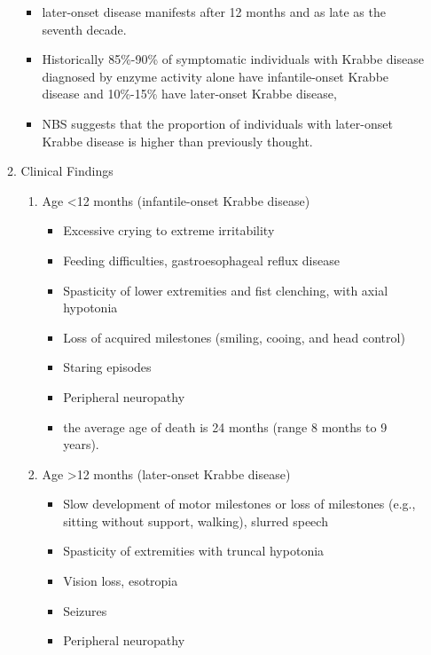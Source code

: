 \documentclass{scrartcl}
\begin{document}
\begin{enumerate}
\begin{enumerate}
\begin{itemize}
\item later-onset disease manifests after 12 months and as late as the
seventh decade.

\item Historically 85\%-90\% of symptomatic individuals with Krabbe disease
diagnosed by enzyme activity alone have infantile-onset Krabbe
disease and 10\%-15\% have later-onset Krabbe disease,

\item NBS suggests that the proportion of individuals with later-onset
Krabbe disease is higher than previously thought.
\end{itemize}

\item Clinical Findings
\label{sec:org411cb1e}

\begin{enumerate}
\item Age <12 months (infantile-onset Krabbe disease)
\label{sec:orgbc9cdb8}

\begin{itemize}
\item Excessive crying to extreme irritability
\item Feeding difficulties, gastroesophageal reflux disease
\item Spasticity of lower extremities and fist clenching, with axial hypotonia
\item Loss of acquired milestones (smiling, cooing, and head control)
\item Staring episodes
\item Peripheral neuropathy
\item the average age of death is 24 months (range 8 months to 9 years).
\end{itemize}

\item Age >12 months (later-onset Krabbe disease)
\label{sec:org36ce434}

\begin{itemize}
\item Slow development of motor milestones or loss of milestones (e.g.,
sitting without support, walking), slurred speech
\item Spasticity of extremities with truncal hypotonia
\item Vision loss, esotropia
\item Seizures
\item Peripheral neuropathy
\end{itemize}
\end{enumerate}
\end{enumerate}


\end{enumerate}
\end{document}
